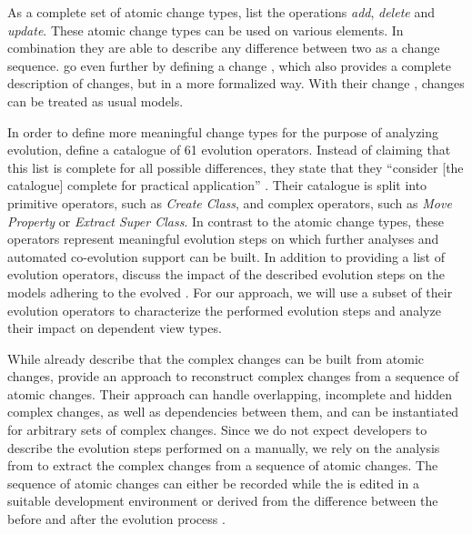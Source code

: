 As a complete set of atomic change types, \textcite{khelladi_detecting_2015} list the operations \emph{add}, \emph{delete} and \emph{update}.
These atomic change types can be used on various \metamodel elements.
In combination they are able to describe any difference between two \metamodels as a change sequence.
\textcite{burger_change_2010} go even further by defining a change \metamodel, which also provides a complete description of \metamodel changes, but in a more formalized way.
With their change \metamodel, \metamodel changes can be treated as usual models.

In order to define more meaningful change types for the purpose of analyzing \metamodel evolution, \textcite{herrmannsdoerfer_extensive_2011} define a catalogue of 61 \metamodel evolution operators.
Instead of claiming that this list is complete for all possible \metamodel differences, they state that they ``consider [the catalogue] complete for practical application'' \autocite{herrmannsdoerfer_extensive_2011}.
Their catalogue is split into primitive operators, such as \emph{Create Class}, and complex operators, such as \emph{Move Property} or \emph{Extract Super Class}.
In contrast to the atomic change types, these operators represent meaningful evolution steps on which further analyses and automated co-evolution support can be built.
In addition to providing a list of \metamodel evolution operators, \textcite{herrmannsdoerfer_extensive_2011} discuss the impact of the described evolution steps on the models adhering to the evolved \metamodels.
For our approach, we will use a subset of their evolution operators to characterize the performed evolution steps and analyze their impact on dependent view types.

While \textcite{herrmannsdoerfer_extensive_2011} already describe that the complex changes can be built from atomic changes, \cite{khelladi_change_2018} provide an approach to reconstruct complex changes from a sequence of atomic changes.
Their approach can handle overlapping, incomplete and hidden complex changes, as well as dependencies between them, and can be instantiated for arbitrary sets of complex changes.
Since we do not expect developers to describe the evolution steps performed on a \metamodel manually, we rely on the analysis from \cite{khelladi_change_2018} to extract the complex changes from a sequence of atomic changes.
The sequence of atomic changes can either be recorded while the \metamodel is edited in a suitable development environment or derived from the difference between the \metamodel before and after the evolution process \autocite{wittler_derivation_2021}.
